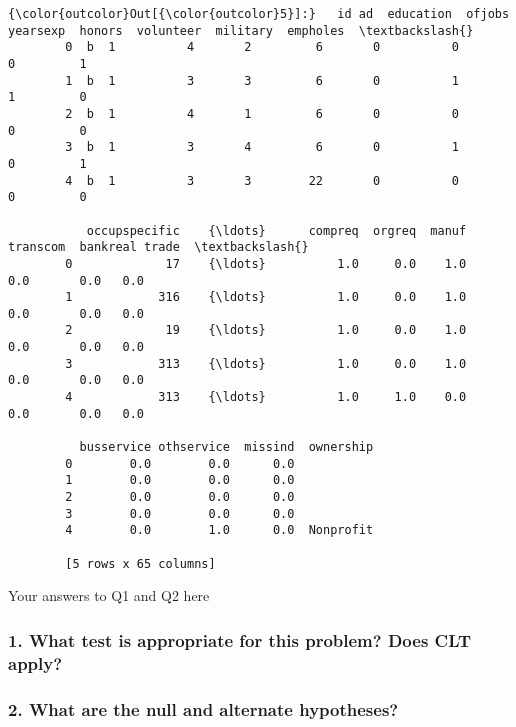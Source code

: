\documentclass[11pt]{article}
\begin{document}
\begin{Verbatim}[commandchars=\\\{\}]
{\color{outcolor}Out[{\color{outcolor}5}]:}   id ad  education  ofjobs  yearsexp  honors  volunteer  military  empholes  \textbackslash{}
        0  b  1          4       2         6       0          0         0         1   
        1  b  1          3       3         6       0          1         1         0   
        2  b  1          4       1         6       0          0         0         0   
        3  b  1          3       4         6       0          1         0         1   
        4  b  1          3       3        22       0          0         0         0   
        
           occupspecific    {\ldots}      compreq  orgreq  manuf  transcom  bankreal trade  \textbackslash{}
        0             17    {\ldots}          1.0     0.0    1.0       0.0       0.0   0.0   
        1            316    {\ldots}          1.0     0.0    1.0       0.0       0.0   0.0   
        2             19    {\ldots}          1.0     0.0    1.0       0.0       0.0   0.0   
        3            313    {\ldots}          1.0     0.0    1.0       0.0       0.0   0.0   
        4            313    {\ldots}          1.0     1.0    0.0       0.0       0.0   0.0   
        
          busservice othservice  missind  ownership  
        0        0.0        0.0      0.0             
        1        0.0        0.0      0.0             
        2        0.0        0.0      0.0             
        3        0.0        0.0      0.0             
        4        0.0        1.0      0.0  Nonprofit  
        
        [5 rows x 65 columns]
\end{Verbatim}
            
    Your answers to Q1 and Q2 here

    \subsubsection{1. What test is appropriate for this problem? Does CLT
apply?}\label{what-test-is-appropriate-for-this-problem-does-clt-apply}

\subsubsection{2. What are the null and alternate
hypotheses?}\label{what-are-the-null-and-alternate-hypotheses}
\end{document}
